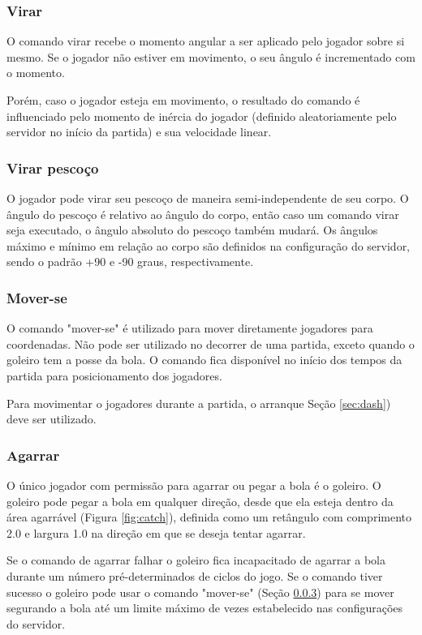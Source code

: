\subsubsection{Virar}

O comando virar recebe o momento angular a ser aplicado pelo jogador sobre si mesmo. Se o jogador não estiver em movimento, o seu ângulo é incrementado com o momento.

Porém, caso o jogador esteja em movimento, o resultado do comando é influenciado pelo momento de inércia do jogador (definido aleatoriamente pelo servidor no início da partida) e sua velocidade linear.

\subsubsection{Virar pescoço}

O jogador pode virar seu pescoço de maneira semi-independente de seu corpo. O ângulo do pescoço é relativo ao ângulo do corpo, então caso um comando virar seja executado, o ângulo absoluto do pescoço também mudará. Os ângulos máximo e mínimo em relação ao corpo são definidos na configuração do servidor, sendo o padrão +90 e -90 graus, respectivamente.

\subsubsection{Mover-se}
\label{sec:move}

O comando "mover-se" é utilizado para mover diretamente jogadores para coordenadas. Não pode ser utilizado no decorrer de uma partida, exceto quando o goleiro tem a posse da bola.  O comando fica disponível no início dos tempos da partida para posicionamento dos jogadores.

Para movimentar o jogadores durante a partida, o arranque Seção \ref{sec:dash}) deve ser utilizado.

\subsubsection{Agarrar}

O único jogador com permissão para agarrar ou pegar a bola é o goleiro. O goleiro pode pegar a bola em qualquer direção, desde que ela esteja dentro da área agarrável (Figura \ref{fig:catch}), definida como um retângulo com comprimento 2.0 e largura 1.0 na direção em que se deseja tentar agarrar.

Se o comando de agarrar falhar o goleiro fica incapacitado de agarrar a bola durante um número pré-determinados de ciclos do jogo. Se o comando tiver sucesso o goleiro pode usar o comando "mover-se" (Seção \ref{sec:move}) para se mover segurando a bola até um limite máximo de vezes estabelecido nas configurações do servidor.

